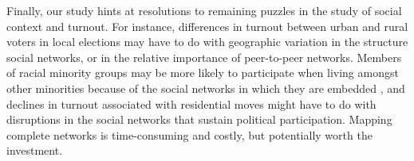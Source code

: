 \documentclass[12pt]{article}
\begin{document}
Finally, our study hints at resolutions to remaining puzzles in the study of social context and turnout.  For instance, differences in turnout between urban and rural voters in local elections may have to do with geographic variation in the structure social networks, or in the relative importance of peer-to-peer networks.  Members of racial minority groups may be more likely to participate when living amongst other minorities because of the social networks in which they are embedded \citep{anoll2018}, and declines in turnout associated with residential moves might have to do with disruptions in the social networks that sustain political participation.  Mapping complete networks is time-consuming and costly, but potentially worth the investment.

\vspace*{-0.4cm}

\singlespacing


\clearpage
\end{document}
